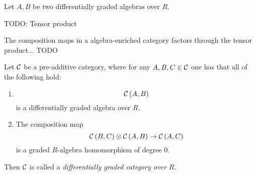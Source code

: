 \begin{definition}
    Let \( A, B \) be two differentially graded algebras over \( R \).

    TODO: Tensor product
\end{definition}

\begin{remark}
    The composition maps in a algebra-enriched category factors through the tensor product... TODO
\end{remark}


\begin{definition}
    Let \( {\mathcal{C}} \) be a pre-additive category, where for any \( A, B, C \in {\mathcal{C}} \) one has that all of the following hold:
    \begin{enumerate}
        \item {
            \[
                {\mathcal{C}}\left( A, B \right)
            \]
            is a differentially graded algebra over \( R \).
        }
        \item {
            The composition map
            \[
                {\mathcal{C}}\left( B, C \right) \otimes {\mathcal{C}}\left( A, B \right)  \to {\mathcal{C}}\left( A, C \right)
            \]
            is a graded \( R \)-algebra homomorphism of degree \( 0 \).
        }
    \end{enumerate}
    Then \( {\mathcal{C}} \) is called a \emph{differentially graded category over \( R \)}.
\end{definition}

